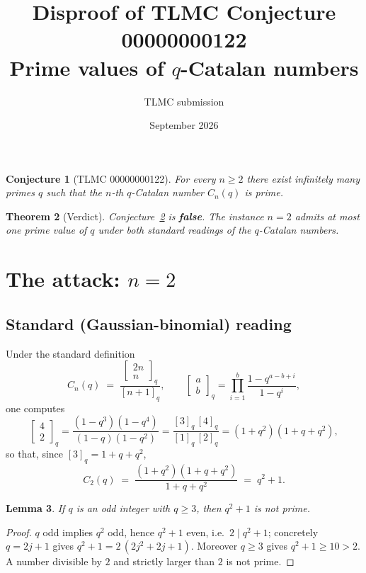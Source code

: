 \documentclass[11pt]{article}
\title{Disproof of TLMC Conjecture 00000000122\\
\large Prime values of $q$-Catalan numbers}
\author{TLMC submission}
\date{September 2026}
\newtheorem{theorem}{Theorem}
\newtheorem{conjecture}[theorem]{Conjecture}
\newtheorem{lemma}[theorem]{Lemma}
\begin{document}
\maketitle

\begin{conjecture}[TLMC 00000000122]
For every $n \ge 2$ there exist infinitely many primes $q$ such that the
$n$-th $q$-Catalan number $C_n(q)$ is prime.
\end{conjecture}

\begin{theorem}[Verdict]\label{thm:verdict}
Conjecture~\ref{thm:verdict} is \textbf{false}. The instance $n = 2$ admits at
most one prime value of $q$ under both standard readings of the
$q$-Catalan numbers.
\end{theorem}

\section{The attack: $n = 2$}

\subsection{Standard (Gaussian-binomial) reading}

Under the standard definition
\[
C_n(q) \;=\; \frac{\begin{bmatrix} 2n \\ n \end{bmatrix}_q}{[n+1]_q},
\qquad
\begin{bmatrix} a \\ b \end{bmatrix}_q = \prod_{i=1}^{b} \frac{1-q^{a-b+i}}{1-q^i},
\]
one computes
\[
\begin{bmatrix} 4 \\ 2 \end{bmatrix}_q
= \frac{(1-q^3)(1-q^4)}{(1-q)(1-q^2)}
= \frac{[3]_q\,[4]_q}{[1]_q\,[2]_q}
= (1+q^2)(1+q+q^2),
\]
so that, since $[3]_q = 1+q+q^2$,
\begin{equation}\label{eq:C2}
C_2(q) \;=\; \frac{(1+q^2)(1+q+q^2)}{1+q+q^2} \;=\; q^2 + 1 .
\end{equation}

\begin{lemma}\label{lem:standard}
If $q$ is an odd integer with $q \ge 3$, then $q^2 + 1$ is not prime.
\end{lemma}

\begin{proof}
$q$ odd implies $q^2$ odd, hence $q^2 + 1$ even, i.e.\ $2 \mid q^2+1$;
concretely $q = 2j+1$ gives $q^2+1 = 2\,(2j^2+2j+1)$. Moreover $q \ge 3$
gives $q^2 + 1 \ge 10 > 2$. A number divisible by $2$ and strictly larger
than $2$ is not prime.
\end{proof}
\end{document}
